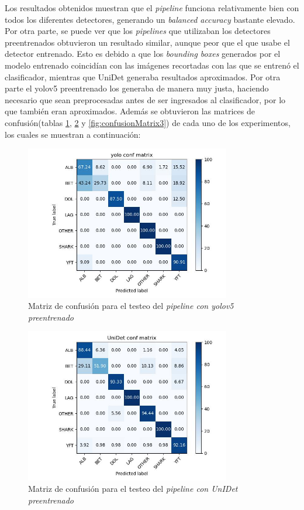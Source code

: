 Los resultados obtenidos muestran que el \textit{pipeline} funciona relativamente bien con todos los diferentes detectores, generando un \textit{balanced accuracy} bastante elevado. Por otra parte, se puede ver que los \textit{pipelines} que utilizaban los detectores preentrenados obtuvieron un resultado similar, aunque peor que el que usabe el detector entrenado. Esto es debido a que los \textit{bounding boxes} generados por el modelo entrenado coincidían con las imágenes recortadas con las que se entrenó el clasificador, mientras que UniDet generaba resultados aproximados. Por otra parte el yolov5 preentrenado los generaba de manera muy justa, haciendo necesario que sean preprocesadas antes de ser ingresados al clasificador, por lo que también eran aproximados.
Además se obtuvieron las matrices de confusión(tablas \ref{fig:confusionMatrix1}, \ref{fig:confusionMatrix2} y \ref{fig:confusionMatrix3}) de cada uno de los experimentos, los cuales se muestran a continuación:

\begin{figure}[h!]
\centering
\includegraphics[width=0.8\textwidth]{images/yolo_conf_matrix.jpg}
\caption{Matriz de confusión para el testeo del \textit{pipeline con yolov5 preentrenado} }
\label{fig:confusionMatrix1}
\end{figure}

\begin{figure}[h!]
\centering
\includegraphics[width=0.8\textwidth]{images/UniDet_conf_matrix.jpg}
\caption{Matriz de confusión para el testeo del \textit{pipeline con UnIDet preentrenado} }
\label{fig:confusionMatrix2}
\end{figure}


